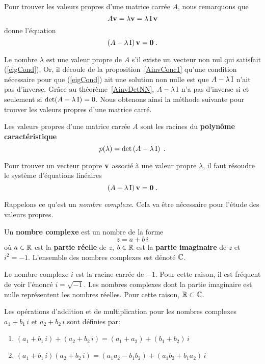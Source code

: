 {Pour trouver les valeurs propres d'une matrice carrée $A$, nous remarquons
que
\[
A\mathbf{v} = \lambda \mathbf{v} = \lambda \operatorname{I} \mathbf{v}
\]
donne l'équation
\begin{equation}\label{eigCond}
\left( A - \lambda \operatorname{I}\right) \mathbf{v} = \mathbf{0} \; .
\end{equation}

Le nombre $\lambda$ est une valeur propre de $A$ s'il existe un
vecteur non nul qui satisfait (\ref{eigCond}).  Or, il découle de la
proposition~\ref{AinvConc1} qu'une condition nécessaire pour que
(\ref{eigCond}) ait une solution non nulle est que $A - \lambda \operatorname{I}$
n'ait pas d'inverse. Grâce au théorème~\ref{AinvDetNN},
$A - \lambda \operatorname{I}$ n'a pas d'inverse si et seulement si
$\det(A -\lambda \operatorname{I})=0$.  Nous obtenons ainsi la méthode suivante pour
trouver les valeurs propres d'une matrice carré.

\begin{focus}{\prp} 
Les valeurs propres d'une matrice carrée $A$ sont les racines du
{\bfseries polynôme caractéristique}
\[
p(\lambda) = \det\left(A-\lambda \operatorname{I}\right) \; .
\]

Pour trouver un vecteur propre $\mathbf{v}$ associé à une valeur propre
$\lambda$, il faut résoudre le système d'équations linéaires
\[
\left(A-\lambda \operatorname{I}\right)\mathbf{v} = \mathbf{0} \; .
\]
\end{focus}

Rappelons ce qu'est un {\em nombre complexe}.  Cela va être nécessaire
pour l'étude des valeurs propres.

\begin{focus}{\dfn}
Un {\bfseries nombre complexe} est un nombre de
la forme
\[
z = a+b\,i
\]
où $a \in \mathbb{R}$ est la
{\bfseries partie réelle} de $z$,
$b\in\mathbb{R}$ est la
{\bfseries partie imaginaire}
de $z$ et $i^2 = -1$.  L'ensemble des nombres complexes est dénoté
$\mathbb{C}$.
\end{focus}

Le nombre complexe $i$ est la racine carrée de $-1$.  Pour cette
raison, il est fréquent de voir l'énoncé $i = \sqrt{-1}$.  Les nombres
complexes dont la partie imaginaire est nulle représentent les nombres
réelles.  Pour cette raison, $\mathbb{R} \subset \mathbb{C}$.

\begin{focus}{\dfn}
Les opérations d'addition et de multiplication pour les nombres
complexes $a_1+b_1\,i$ et $a_2 + b_2\,i$ sont définies par:
\begin{enumerate}
\item $(a_1+b_1\,i) + (a_2 + b_2\,i) = (a_1+a_2)+(b_1+b_2)\,i$ 
\item $(a_1+b_1\,i)(a_2 + b_2\,i) = (a_1a_2-b_1 b_2)+(a_1 b_2+b_1 a_2)\,i$
\end{enumerate}
\end{focus}

}

